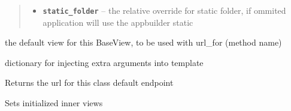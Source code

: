 \documentclass[letterpaper,10pt,english]{sphinxmanual}
\begin{document}
\begin{fulllineitems}
\begin{fulllineitems}
\begin{quote}
\begin{description}
\begin{itemize}
\item {} 
\textbf{\texttt{static\_folder}} -- the relative override for static folder, if ommited application will use the appbuilder static

\end{itemize}

\end{description}\end{quote}

\end{fulllineitems}


\begin{fulllineitems}
\label{api:flask.ext.appbuilder.baseviews.BaseView.default_view}
the default view for this BaseView, to be used with url\_for (method name)

\end{fulllineitems}


\begin{fulllineitems}
\label{api:flask.ext.appbuilder.baseviews.BaseView.extra_args}
dictionary for injecting extra arguments into template

\end{fulllineitems}


\begin{fulllineitems}
\label{api:flask.ext.appbuilder.baseviews.BaseView.get_default_url}
Returns the url for this class default endpoint

\end{fulllineitems}


\begin{fulllineitems}
\label{api:flask.ext.appbuilder.baseviews.BaseView.get_init_inner_views}
Sets initialized inner views

\end{fulllineitems}


\end{fulllineitems}
\end{document}
